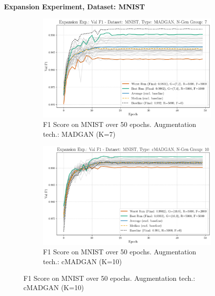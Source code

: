 \newpage
\noindent\textbf{Expansion Experiment, Dataset: MNIST}
\begin{figure}[H]
	\centering
	\begin{subfigure}{.85\textwidth}
		\includegraphics[width=\textwidth]{abb/strat_classifier_performance/MNIST_STRATIFIED_CLASSIFIERS_MADGAN_NEW/expansion_experiments/val_f1_score_MADGAN_MNIST_n_gen_7_all.png}
		\caption{F1 Score on MNIST over 50 epochs. Augmentation tech.: MADGAN (K=7)}
        \label{fig:res_expansion_mnist_cmadgan_vs_madgan__madgan}
	\end{subfigure}
	\begin{subfigure}{.85\textwidth}
		\includegraphics[width=\textwidth]{abb/strat_classifier_performance/MNIST_STRATIFIED_CLASSIFIERS_cMADGAN_NEW/expansion_experiments/val_f1_score_cMADGAN_MNIST_n_gen_10_all.png}
		\caption{F1 Score on MNIST over 50 epochs. Augmentation tech.: cMADGAN (K=10)}
        \label{fig:res_expansion_mnist_cmadgan_vs_madgan__cmadgan}
	\end{subfigure}
\end{figure}

